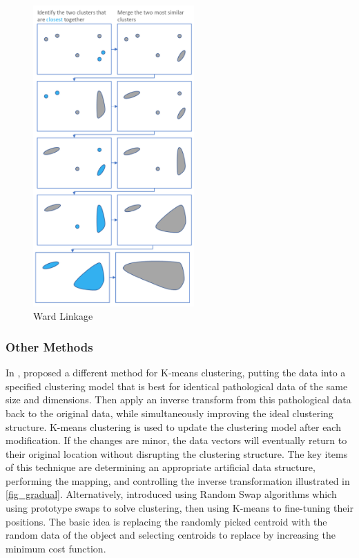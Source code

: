 \documentclass[a4paper, 12pt]{article}
\begin{document}
\begin{figure}[htbp!]
    \centering
    \includegraphics[width=0.55\textwidth]{Ward Linkage.png}
    \caption{Ward Linkage \citep{hierarchicaltutorial2017}}
    \label{fig15}
\end{figure}

\pagebreak

\subsubsection{Other Methods}
In \citeyear{malinen2014k}, \citet{malinen2014k} proposed a different method for K-means clustering, putting the data into a specified clustering model that is best for identical pathological data of the same size and dimensions. Then apply an inverse transform from this pathological data back to the original data, while simultaneously improving the ideal clustering structure. K-means clustering is used to update the clustering model after each modification. If the changes are minor, the data vectors will eventually return to their original location without disrupting the clustering structure. The key items of this technique are determining an appropriate artificial data structure, performing the mapping, and controlling the inverse transformation illustrated in \autoref{fig_gradual}. Alternatively, \citet{franti2018efficiency} introduced using Random Swap algorithms which using prototype swaps to solve clustering, then using K-means to fine-tuning their positions. The basic idea is replacing the randomly picked centroid with the random data of the object and selecting centroids to replace by increasing the minimum cost function.
\end{document}
